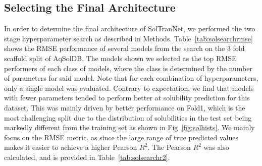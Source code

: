 \documentclass[journal=jmcmar,manuscript=article]{achemso}
\begin{document}
\subsection{Selecting the Final Architecture}

In order to determine the final architecture of SolTranNet, we performed the two stage hyperparameter search as described in Methods.
Table~\ref{tab:solsearchrmse} shows the RMSE performance of several models from the search on the 3 fold scaffold split of AqSolDB.
The models shown we selected as the top RMSE performers of each class of models, where the class is determined by the number of parameters for said model.
Note that for each combination of hyperparameters, only a single model was evaluated.
Contrary to expectation, we find that models with fewer parameters tended to perform better at solubility prediction for this dataset.
This was mainly driven by better performance on Fold1, which is the most challenging split due to the distribution of solubilities in the test set being markedly different from the training set as shown in Fig~\ref{fig:solhists}.
We mainly focus on the RMSE metric, as since the large range of true predicted values makes it easier to achieve a higher Pearson $R^2$.
The Pearson $R^2$ was also calculated, and is provided in Table~\ref{tab:solsearchr2}.
\end{document}
